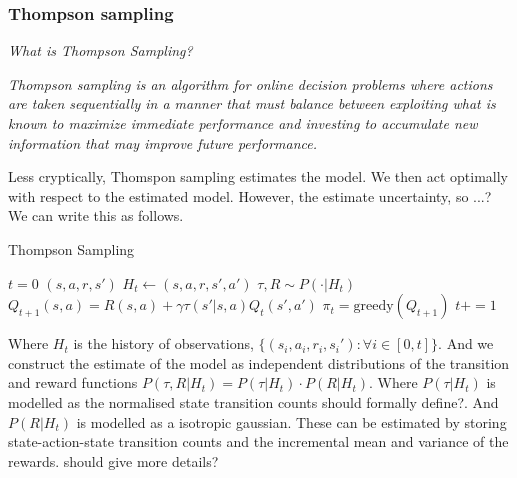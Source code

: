\subsubsection{Thompson sampling} \label{ts}
\begin{displayquote}
	\textsl{What is Thompson Sampling?}
\end{displayquote}

\begin{displayquote}
	\textit{Thompson sampling is an algorithm for online decision problems where actions are taken sequentially in a manner that
must balance between exploiting what is known to maximize immediate performance and investing to accumulate
new information that may improve future performance.}\cite{Russo2017}
\end{displayquote}

Less cryptically, Thomspon sampling estimates the model. We then act optimally with respect to the estimated model. However, the estimate uncertainty, so ...? We can write this as follows.

\begin{algorithm}
	\caption{Thompson Sampling}
	\begin{algorithmic}[1]

		\State $t=0$
		\State $(s, a, r, s')$ 
		\State $H_t \leftarrow (s, a, r, s', a')$ 
		\State $\tau, R \sim P(\cdot | H_t)$ 
		\State $Q_{t+1}(s, a) = R(s, a) + \gamma \tau(s'| s, a) Q_t(s', a')$ 
		\State $\pi_t = \text{greedy}(Q_{t+1})$ 
		\State $t += 1$

		\EndWhile
		\State {}
		\EndProcedure

	\end{algorithmic}
\end{algorithm}

Where $H_t$ is the history of observations, $\{(s_i, a_i, r_i, s_i') : \forall i \in [0, t]\}$.
And we construct the estimate of the model as independent distributions of the transition and reward functions $P(\tau, R | H_t) = P(\tau | H_t) \cdot P(R | H_t)$. Where $P(\tau | H_t)$
is modelled as the normalised state transition counts {\color{red}should formally define?}.
And $P(R | H_t)$ is modelled as a isotropic gaussian.
These can be estimated by storing state-action-state transition counts
and the incremental mean and variance of the rewards. {\color{red}should give more details?}

